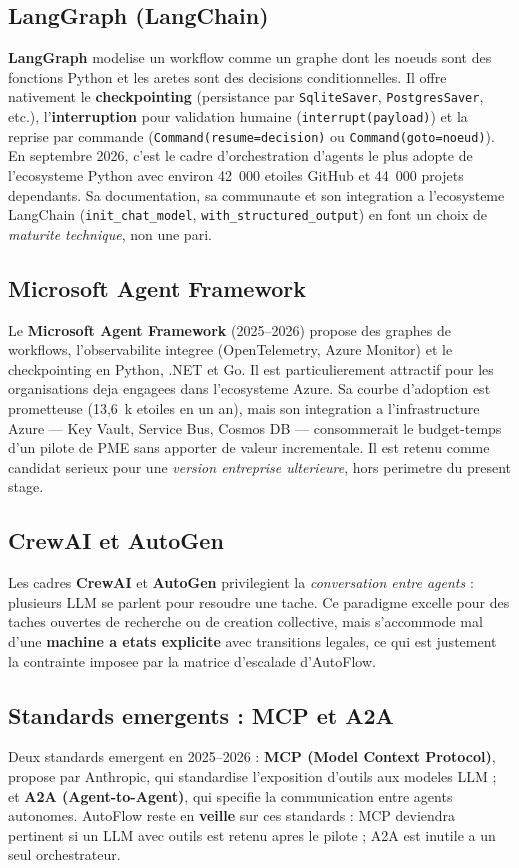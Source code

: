 \documentclass[12pt,a4paper,openany]{report}
\begin{document}
\subsection{LangGraph (LangChain)}
\textbf{LangGraph} modelise un workflow comme un graphe dont les noeuds sont des fonctions Python et les aretes sont des decisions conditionnelles. Il offre nativement le \textbf{checkpointing} (persistance par \texttt{SqliteSaver}, \texttt{PostgresSaver}, etc.), l'\textbf{interruption} pour validation humaine (\texttt{interrupt(payload)}) et la reprise par commande (\texttt{Command(resume=decision)} ou \texttt{Command(goto=noeud)}). En septembre 2026, c'est le cadre d'orchestration d'agents le plus adopte de l'ecosysteme Python avec environ 42~000 etoiles GitHub et 44~000 projets dependants. Sa documentation, sa communaute et son integration a l'ecosysteme LangChain (\texttt{init\_chat\_model}, \texttt{with\_structured\_output}) en font un choix de \emph{maturite technique}, non une pari.

\subsection{Microsoft Agent Framework}
Le \textbf{Microsoft Agent Framework} (2025--2026) propose des graphes de workflows, l'observabilite integree (OpenTelemetry, Azure Monitor) et le checkpointing en Python, .NET et Go. Il est particulierement attractif pour les organisations deja engagees dans l'ecosysteme Azure. Sa courbe d'adoption est prometteuse (13,6~k etoiles en un an), mais son integration a l'infrastructure Azure --- Key Vault, Service Bus, Cosmos DB --- consommerait le budget-temps d'un pilote de PME sans apporter de valeur incrementale. Il est retenu comme candidat serieux pour une \emph{version entreprise ulterieure}, hors perimetre du present stage.

\subsection{CrewAI et AutoGen}
Les cadres \textbf{CrewAI} et \textbf{AutoGen} privilegient la \emph{conversation entre agents} : plusieurs LLM se parlent pour resoudre une tache. Ce paradigme excelle pour des taches ouvertes de recherche ou de creation collective, mais s'accommode mal d'une \textbf{machine a etats explicite} avec transitions legales, ce qui est justement la contrainte imposee par la matrice d'escalade d'AutoFlow.

\subsection{Standards emergents : MCP et A2A}
Deux standards emergent en 2025--2026 : \textbf{MCP (Model Context Protocol)}, propose par Anthropic, qui standardise l'exposition d'outils aux modeles LLM ; et \textbf{A2A (Agent-to-Agent)}, qui specifie la communication entre agents autonomes. AutoFlow reste en \textbf{veille} sur ces standards : MCP deviendra pertinent si un LLM avec outils est retenu apres le pilote ; A2A est inutile a un seul orchestrateur.
\end{document}

